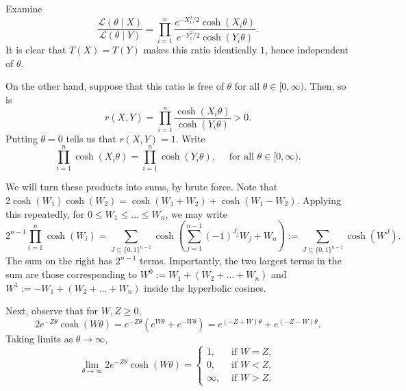 \documentclass[11pt]{article}
\begin{document}
\begin{enumerate}
        Examine \[
            \frac{\mathcal{L}(\theta\mid X)}{\mathcal{L}(\theta\mid Y)}
                = \prod_{i = 1}^n \frac{e^{-X_i^2 / 2} \cosh(X_i\theta)}{e^{-Y_i^2 / 2} \cosh(Y_i\theta)}.
        \] It is clear that $T(X) = T(Y)$ makes this ratio identically $1$,
        hence independent of $\theta$.

        On the other hand, suppose that this ratio is free of $\theta$ for all
        $\theta \in [0, \infty)$.
        Then, so is \[
            r(X, Y) = \prod_{i = 1}^n \frac{\cosh(X_i\theta)}{\cosh(Y_i\theta)} > 0.
        \] Putting $\theta = 0$ tells us that $r(X, Y) = 1$.
        Write \[
            \prod_{i = 1}^n \cosh(X_i\theta)
                = \prod_{i = 1}^n \cosh(Y_i\theta), \quad \text{ for all } \theta \in [0, \infty).
                    \tag{$\star$}
        \]

        We will turn these products into sums, by brute force.
        Note that $2\cosh(W_1)\cosh(W_2) = \cosh(W_1 + W_2) + \cosh(W_1 -
        W_2)$.
        Applying this repeatedly, for $0 \leq W_1 \leq \dots \leq W_n$, we may
        write \[
            2^{n - 1}\prod_{i = 1}^n \cosh(W_i)
                = \sum_{J \subseteq \{0, 1\}^{n - 1}} \cosh\left(\sum_{j = 1}^{n - 1} (-1)^{J_j} W_j + W_n\right)
                := \sum_{J \subseteq \{0, 1\}^{n - 1}} \cosh(W^J).
        \] The sum on the right has $2^{n - 1}$ terms.
        Importantly, the two largest terms in the sum are those corresponding
        to $W^0 := W_1 + (W_2 + \dots + W_n)$ and $W^1 := -W_1 + (W_2 + \dots +
        W_n)$ inside the hyperbolic cosines.

        Next, observe that for $W, Z \geq 0$, \[
            2e^{-Z\theta}\cosh(W\theta)
                = e^{-Z\theta}\left(e^{W\theta} + e^{-W\theta}\right)
                = e^{(-Z + W)\theta} + e^{(-Z - W)\theta}.
        \] Taking limits as $\theta \to \infty$, \[
            \lim_{\theta \to \infty} 2e^{-Z\theta} \cosh(W\theta)
                = \begin{cases}
                    1, &\text{ if } W = Z, \\
                    0, &\text{ if } W < Z, \\
                    \infty, &\text{ if } W > Z.
                \end{cases}
        \]


\end{enumerate}
\end{document}
